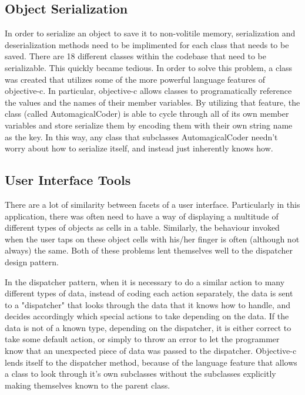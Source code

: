 \documentclass[se]{uw-wkrpt}
\begin{document}
\subsection{Object Serialization}

In order to serialize an object to save it to non-volitile memory,
serialization and deserialization methods need to be implimented for each class that
needs to be saved. There are 18 different classes within the codebase that need to
be serializable. This quickly became tedious. In order to solve this problem, a class
was created that utilizes some of the more powerful language features of objective-c.
In particular, objective-c allows classes to programatically reference the values
and the names of their member variables. By utilizing that feature, the class (called AutomagicalCoder)  is able
to cycle through all of its own member variables and store serialize them by encoding them
with their own string name as the key. In this way, any class that subclasses AutomagicalCoder
needn't worry about how to serialize itself, and instead just inherently knows how.

\subsection{User Interface Tools}

There are a lot of similarity between facets of a user interface. Particularly in this
application, there was often need to have a way of displaying a multitude of different
types of objects as cells in a table. Similarly, the behaviour invoked when the user
taps on these object cells with his/her finger is often (although not always) the same.
Both of these problems lent themselves well to the dispatcher design pattern. 

In the dispatcher pattern,
when it is necessary to do a similar action to many different types of data, instead of coding
each action separately, the data is sent to a "dispatcher" that looks through the data that
it knows how to handle, and decides accordingly which special actions to take depending on
the data. If the data is not of a known type, depending on the dispatcher, it is either correct
to take some default action, or simply to throw an error to let the programmer know that 
an unexpected piece of data was passed to the dispatcher. Objective-c lends itself to the 
dispatcher method, because of the language feature that allows a class to look through it's
own subclasses without the subclasses explicitly making themselves known to the parent class.
\end{document}
